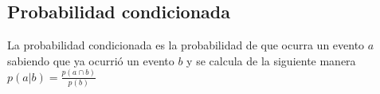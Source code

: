 \subsection{Probabilidad condicionada}
La probabilidad condicionada es la probabilidad de que ocurra un evento $a$ sabiendo que ya ocurrió un evento $b$ y se calcula de la siguiente manera $p(a|b)=\frac{p(a\cap b)}{p(b)}$
